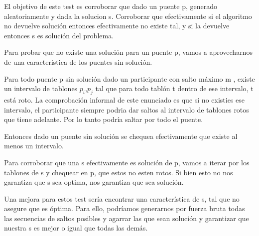 El objetivo de este test es corroborar que dado un puente p, generado aleatoriamente y dada la solucion s. Corroborar que efectivamente si el algoritmo no devuelve soluci\'on entonces efectivamente no existe tal, y si la devuelve entonces s es soluci\'on del problema.

Para probar que no existe una soluci\'on para un puente p, vamos a aprovecharnos de una caracteristica de los puentes sin soluci\'on.

Para todo puente p sin soluci\'on dado un participante con salto m\'aximo m , existe un intervalo de tablones $p_{i}$,$p_{j}$ tal que para todo tabl\'on t dentro de ese intervalo, t est\'a roto.
La comprobaci\'on informal de este enunciado es que si no existies ese intervalo, el participante siempre podria dar saltos al intervalo de tablones rotos que tiene adelante. Por lo tanto podr\'ia saltar por todo el puente.

Entonces dado un puente sin soluci\'on se chequea efectivamente que existe al menos un intervalo.

Para corroborar que una s efectivamente es soluci\'on de p, vamos a iterar por los tablones de s y chequear en p, que estos no esten rotos.
Si bien esto no nos garantiza que s sea optima, nos garantiza que sea soluci\'on.

Una mejora para estos test ser\'ia encontrar una caracter\'istica de s, tal que no asegure que es \'optima. Para ello, podr\'iamos generarnos por fuerza bruta todas las secuencias de saltos posibles y agarrar las que sean soluci\'on y garantizar que nuestra s es mejor o igual que todas las dem\'as.